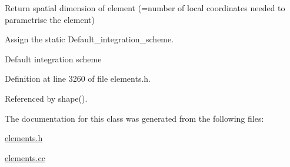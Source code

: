 Return spatial dimension of element (=number of local coordinates needed to parametrise the element) 

Assign the static Default\+\_\+integration\+\_\+scheme.

Default integration scheme 

Definition at line 3260 of file elements.\+h.



Referenced by shape().



The documentation for this class was generated from the following files\+:\begin{DoxyCompactItemize}
\item 
\hyperlink{elements_8h}{elements.\+h}\item 
\hyperlink{elements_8cc}{elements.\+cc}\end{DoxyCompactItemize}
